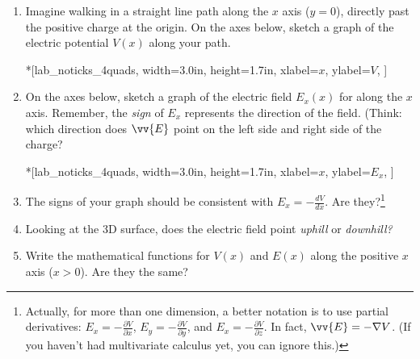 \begin{enumerate}[labparts]

\item Imagine walking in a straight line path along the $x$ axis ($y=0$), directly past the positive charge at the origin.  On the axes below, sketch a graph of the electric potential $V(x)$ along your path.  

\begin{lab_axis}*[lab_noticks_4quads,
	width={3.0in}, height={1.7in},
	xlabel=$x$,
	ylabel=$V$,
	]
\end{lab_axis}

\item On the axes below, sketch a graph of the electric field $E_x(x)$ for along the $x$ axis.  Remember, the \textit{sign} of $E_x$ represents the direction of the field.  (Think: which direction does $\vv{E}$ point on the left side and right side of the charge?

\begin{lab_axis}*[lab_noticks_4quads,
	width={3.0in}, height={1.7in},
	xlabel=$x$,
	ylabel=$E_x$,
	]
\end{lab_axis}


\item The signs of your graph should be consistent with 
$\displaystyle E_x=-\frac{dV}{dx}$. Are they?\footnote{Actually, for more than one dimension, a better notation is to use partial derivatives: 
$\displaystyle E_x=-\frac{\partial V}{\partial x}$,  
$\displaystyle E_y=-\frac{\partial V}{\partial y}$, and 
$\displaystyle E_x=-\frac{\partial V}{\partial z}$.
In fact, $\vv{E}=-\nabla V$.  (If you haven't had multivariate calculus yet, you can ignore this.)}
\answerspace{0.3in}

\item Looking at the 3D surface, does the electric field point \textit{uphill} or \textit{downhill?}
\answerspace{0.3in}

\item Write the mathematical functions for $V(x)$ and $E(x)$ along the positive $x$ axis ($x > 0$).  Are they the same?
\answerspace{0.3in}

\end{enumerate}

